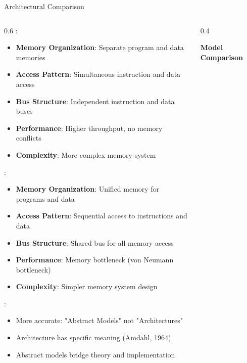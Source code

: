 \begin{frame}{Architectural Comparison}
\begin{columns}
\begin{column}{0.6\textwidth}
:
\begin{itemize}
\item \textbf{Memory Organization}: Separate program and data memories
\item \textbf{Access Pattern}: Simultaneous instruction and data access
\item \textbf{Bus Structure}: Independent instruction and data buses
\item \textbf{Performance}: Higher throughput, no memory conflicts
\item \textbf{Complexity}: More complex memory system
\end{itemize}

\vspace{0.3cm}
:
\begin{itemize}
\item \textbf{Memory Organization}: Unified memory for programs and data
\item \textbf{Access Pattern}: Sequential access to instructions and data
\item \textbf{Bus Structure}: Shared bus for all memory access
\item \textbf{Performance}: Memory bottleneck (von Neumann bottleneck)
\item \textbf{Complexity}: Simpler memory system design
\end{itemize}

\vspace{0.3cm}
:
\begin{itemize}
\item More accurate: "Abstract Models" not "Architectures"
\item Architecture has specific meaning (Amdahl, 1964)
\item Abstract models bridge theory and implementation
\end{itemize}
\end{column}
\begin{column}{0.4\textwidth}
\begin{center}
\textbf{Model Comparison}
\vspace{0.3cm}

\end{center}
\end{column}
\end{columns}
\end{frame}
